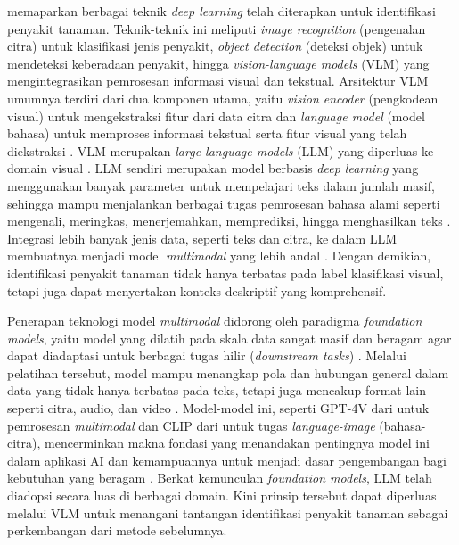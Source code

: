 \textcite{upadhyayDeepLearningComputer2025} memaparkan berbagai teknik \textit{deep learning} telah diterapkan untuk identifikasi penyakit tanaman. Teknik-teknik ini meliputi \textit{image recognition} (pengenalan citra) untuk klasifikasi jenis penyakit, \textit{object detection} (deteksi objek) untuk mendeteksi keberadaan penyakit, hingga \textit{vision-language models} (VLM) yang mengintegrasikan pemrosesan informasi visual dan tekstual. Arsitektur VLM umumnya terdiri dari dua komponen utama, yaitu \textit{vision encoder} (pengkodean visual) untuk mengekstraksi fitur dari data citra dan \textit{language model} (model bahasa) untuk memproses informasi tekstual serta fitur visual yang telah diekstraksi \parencite{bordesIntroductionVisionLanguageModeling2024}. VLM merupakan \textit{large language models} (LLM) yang diperluas ke domain visual \parencite{bordesIntroductionVisionLanguageModeling2024}. LLM sendiri merupakan model berbasis \textit{deep learning} yang menggunakan banyak parameter untuk mempelajari teks dalam jumlah masif, sehingga mampu menjalankan berbagai tugas pemrosesan bahasa alami seperti mengenali, meringkas, menerjemahkan, memprediksi, hingga menghasilkan teks \parencite{altoBuildingLLMPowerd2024}. Integrasi lebih banyak jenis data, seperti teks dan citra, ke dalam LLM membuatnya menjadi model \textit{multimodal} yang lebih andal \parencite{huyenAIEngineeringBuilding2025}. Dengan demikian, identifikasi penyakit tanaman tidak hanya terbatas pada label klasifikasi visual, tetapi juga dapat menyertakan konteks deskriptif yang komprehensif.

Penerapan teknologi model \textit{\textit{multimodal}} didorong oleh paradigma \textit{foundation models}, yaitu model yang dilatih pada skala data sangat masif dan beragam agar dapat diadaptasi untuk berbagai tugas hilir (\textit{downstream tasks}) \parencite{bommasaniOpportunitiesRisksFoundation2022}. Melalui pelatihan tersebut, model mampu menangkap pola dan hubungan general dalam data yang tidak hanya terbatas pada teks, tetapi juga mencakup format lain seperti citra, audio, dan video \parencite{altoBuildingLLMPowerd2024}. Model-model ini, seperti GPT-4V dari \textcite{openaiGPT4VSystemCard2023} untuk pemrosesan \textit{multimodal} dan CLIP dari \textcite{radfordLearningTransferableVisual2021} untuk tugas \textit{language-image} (bahasa-citra), mencerminkan makna fondasi yang menandakan pentingnya model ini dalam aplikasi AI dan kemampuannya untuk menjadi dasar pengembangan bagi kebutuhan yang beragam \parencite{huyenAIEngineeringBuilding2025}. Berkat kemunculan \textit{foundation models}, LLM telah diadopsi secara luas di berbagai domain. Kini prinsip tersebut dapat diperluas melalui VLM untuk menangani tantangan identifikasi penyakit tanaman sebagai perkembangan dari metode sebelumnya. 

